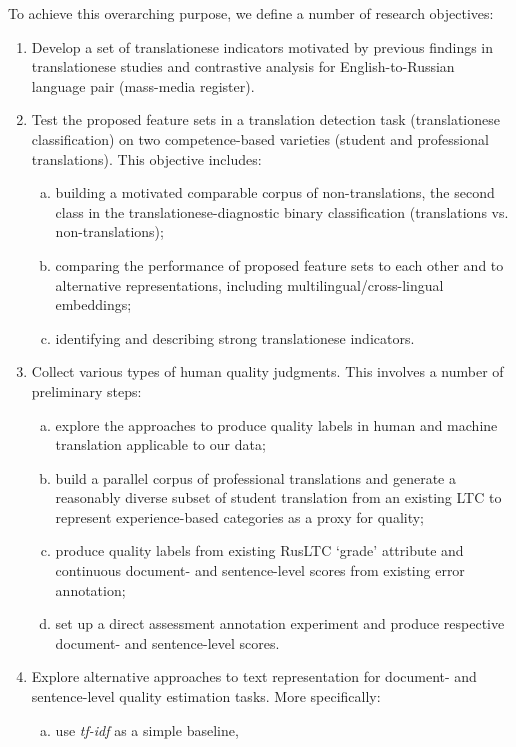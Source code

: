 To achieve this overarching purpose, we define a number of research objectives:
\begin{enumerate}\compresslist{}
	\item Develop a set of translationese indicators motivated by previous findings in translationese studies and contrastive analysis for English-to-Russian language pair (mass-media register).
	\item Test the proposed feature sets in a translation detection task (translationese classification) on two competence-based varieties (student and professional translations). This objective includes:
	\begin{enumerate}[(a)]\compresslist{}
		\item building a motivated comparable corpus of non-translations, the second class in the translationese-diagnostic binary classification (translations vs. non-translations); 
		\item comparing the performance of proposed feature sets to each other and to alternative representations, including multilingual/cross-lingual embeddings;
		\item identifying and describing strong translationese indicators.
	\end{enumerate}
	\item Collect various types of human quality judgments. This involves a number of preliminary steps:
	\begin{enumerate}[(a)]
		\item explore the approaches to produce quality labels in human and machine translation applicable to our data;
		\item build a parallel corpus of professional translations and generate a reasonably diverse subset of student translation from an existing \gls{LTC} to represent experience-based categories as a proxy for quality;
		\item produce quality labels from existing \gls{RusLTC} `grade' attribute and continuous document- and sentence-level scores from existing error annotation;
		\item set up a direct assessment annotation experiment and produce respective document- and sentence-level scores.
	\end{enumerate} 
	\item Explore alternative approaches to text representation for document- and sentence-level quality estimation tasks. More specifically:
	\begin{enumerate}[(a)]
		\item use \textit{tf-idf} as a simple baseline,

\end{enumerate}
\end{enumerate}
